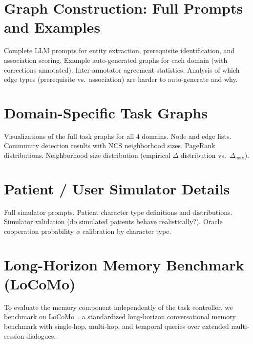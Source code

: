 \documentclass[11pt,a4paper]{article}
\newcommand{\placeholder}[1]{%
  \begin{tcolorbox}[colback=yellow!10,colframe=orange!60!black,
    fonttitle=\bfseries,title=Placeholder]
    #1
  \end{tcolorbox}%
}
\begin{document}
\section{Graph Construction: Full Prompts and Examples}
\label{app:graph_prompts}

\placeholder{%
  Complete LLM prompts for entity extraction, prerequisite identification,
  and association scoring.
  Example auto-generated graphs for each domain (with corrections annotated).
  Inter-annotator agreement statistics.
  Analysis of which edge types (prerequisite vs.\ association) are harder
  to auto-generate and why.
}

\section{Domain-Specific Task Graphs}
\label{app:graphs}

\placeholder{%
  Visualizations of the full task graphs for all 4 domains.
  Node and edge lists.
  Community detection results with NCS neighborhood sizes.
  PageRank distributions.
  Neighborhood size distribution (empirical $\Delta$ distribution
  vs.\ $\Delta_{\max}$).
}

\section{Patient / User Simulator Details}
\label{app:simulator}

\placeholder{%
  Full simulator prompts.
  Patient character type definitions and distributions.
  Simulator validation (do simulated patients behave realistically?).
  Oracle cooperation probability $\phi$ calibration by character type.
}

\section{Long-Horizon Memory Benchmark (LoCoMo)}
\label{app:locomo}

To evaluate the memory component independently of the task controller, we
benchmark on LoCoMo~\cite{locomo_ref}, a standardized long-horizon
conversational memory benchmark with single-hop, multi-hop, and temporal
queries over extended multi-session dialogues.

\begin{table}[!htbp]
\centering
\caption{LoCoMo benchmark results. Overall accuracy (\%) and by query
category. Best in bold.}
\label{tab:locomo}
\small

\end{table}
\end{document}
